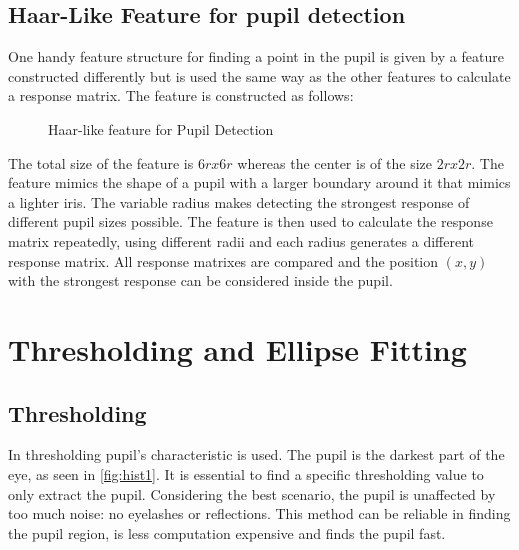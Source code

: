 \subsection{Haar-Like Feature for pupil detection }
One handy feature structure \cite{swirski_robust_2012} for finding a point in the pupil is given by a feature constructed differently but is used the same way as the other features to calculate a response matrix. The feature is constructed as follows: 
\begin{figure}[h]
    \centering
\label{haar_pupil}
\caption{Haar-like feature for Pupil Detection}
\end{figure}
The total size of the feature is $6rx6r$ whereas the center is of the size $2rx2r$. The feature mimics the shape of a pupil with a larger boundary around it that mimics a lighter iris. The variable radius makes detecting the strongest response of different pupil sizes possible. The feature is then used to calculate the response matrix repeatedly, using different radii and each radius generates a different response matrix. All response matrixes are compared and the position $(x,y)$ with the strongest response can be considered inside the pupil.

\section{Thresholding and Ellipse Fitting}
\subsection{Thresholding}
In thresholding pupil's characteristic is used. The pupil is the darkest part of the eye, as seen in \ref{fig:hist1}. It is essential to find a specific thresholding value to only extract the pupil. Considering the best scenario, the pupil is unaffected by too much noise: no eyelashes or reflections. This method can be reliable in finding the pupil region, is less computation expensive and finds the pupil fast. 

